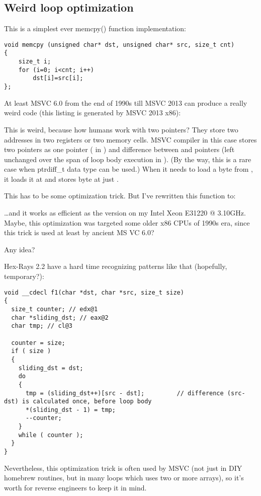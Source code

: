 \subsection{Weird loop optimization}

This is a simplest ever memcpy() function implementation:

\begin{lstlisting}[style=customc]
void memcpy (unsigned char* dst, unsigned char* src, size_t cnt)
{
	size_t i;
	for (i=0; i<cnt; i++)
		dst[i]=src[i];
};
\end{lstlisting}

At least MSVC 6.0 from the end of 1990s till MSVC 2013 can produce a really weird code (this listing is generated by MSVC 2013 x86):



This is weird, because how humans work with two pointers? They store two addresses in two registers or two memory cells.
MSVC compiler in this case stores two pointers as one pointer ( in \EAX) 
and difference between  and  pointers (left unchanged over the span of loop body execution in \ESI).
(By the way, this is a rare case when ptrdiff\_t data type can be used.)
When it needs to load a byte from , it loads it at  and stores byte
at just .

This has to be some optimization trick. But I've rewritten this function to:



\dots and it works as efficient as the  version on my Intel Xeon E31220 @ 3.10GHz.
Maybe, this optimization was targeted some older x86 CPUs of 1990s era, since this trick is used at least by ancient MS VC 6.0?

Any idea?

Hex-Rays 2.2 have a hard time recognizing patterns like that (hopefully, temporary?):

\begin{lstlisting}[style=customc]
void __cdecl f1(char *dst, char *src, size_t size)
{
  size_t counter; // edx@1
  char *sliding_dst; // eax@2
  char tmp; // cl@3

  counter = size;
  if ( size )
  {
    sliding_dst = dst;
    do
    {
      tmp = (sliding_dst++)[src - dst];         // difference (src-dst) is calculated once, before loop body
      *(sliding_dst - 1) = tmp;
      --counter;
    }
    while ( counter );
  }
}
\end{lstlisting}

Nevertheless, this optimization trick is often used by MSVC (not just in \ac{DIY} homebrew  routines,
but in many loops which uses two or more arrays),
so it's worth for reverse engineers to keep it in mind.


